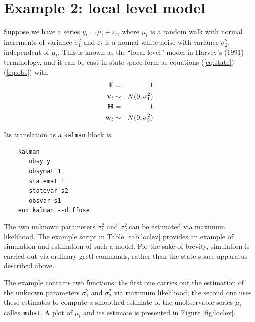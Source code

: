 \documentclass[a4paper]{article}
\newcommand{\obsmat}{\ensuremath\mathbf{H}}
\newcommand{\obsdist}{\ensuremath\mathbf{w}}
\newcommand{\statemat}{\ensuremath\mathbf{F}}
\newcommand{\strdist}{\ensuremath\mathbf{v}}
\begin{document}
\section{Example 2: local level model}
\label{sec:example_loclev}

Suppose we have a series $y_t = \mu_t + \varepsilon_t$, where $\mu_t$
is a random walk with normal increments of variance $\sigma^2_1$ and $
\varepsilon_t$ is a normal white noise with variance $\sigma^2_2$,
independent of $\mu_t$. This is known as the ``local level'' model in
Harvey's (1991) terminology, and it can be cast in state-space form as
equations (\ref{eq:state})-(\ref{eq:obs}) with
\begin{eqnarray*}
  \statemat & = & 1 \\
  \strdist_t & \sim & N(0, \sigma^2_1) \\
  \obsmat & = & 1 \\
  \obsdist_t & \sim & N(0, \sigma^2_2)
\end{eqnarray*}

Its translation as a \texttt{kalman} block is
\begin{verbatim}
    kalman
       obsy y
       obsymat 1
       statemat 1
       statevar s2
       obsvar s1
    end kalman --diffuse
\end{verbatim}

The two unknown parameters $\sigma^2_1$ and $\sigma^2_2$ can be
estimated via maximum likelihood.  The example script in
Table~\ref{tab:loclev} provides an example of simulation and
estimation of such a model. For the sake of brevity, simulation is
carried out via ordinary gretl commands, rather than the state-space
apparatus described above.

The example contains two functions: the first one carries out the
estimation of the unknown parameters $\sigma^2_1$ and $\sigma^2_2$ via
maximum likelihood; the second one uses these estimates to compute a
smoothed estimate of the unobservable series $\mu_t$ calles
\texttt{muhat}. A plot of $\mu_t$ and its estimate is presented in
Figure \ref{fig:loclev}.
\end{document}
